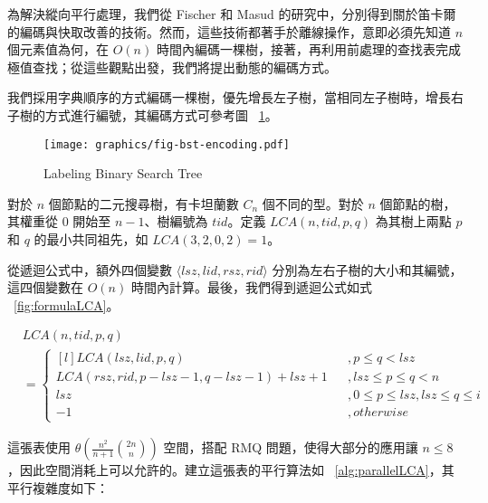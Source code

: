 \documentclass{gapd}
\begin{document}
為解決縱向平行處理，我們從 Fischer \cite{fischer} 和 Masud \cite{masud} 的研究中，分別得到關於笛卡爾的編碼與快取改善的技術。然而，這些技術都著手於離線操作，意即必須先知道 $n$ 個元素值為何，在 $O(n)$ 時間內編碼一棵樹，接著，再利用前處理的查找表完成極值查找；從這些觀點出發，我們將提出動態的編碼方式。

我們採用字典順序的方式編碼一棵樹，優先增長左子樹，當相同左子樹時，增長右子樹的方式進行編號，其編碼方式可參考圖 ~\ref{fig:lablingBST}。

\begin{figure}[!thb]
  \centering
  \texttt{[image: graphics/fig-bst-encoding.pdf]}
  \caption{Labeling Binary Search Tree}
  \label{fig:lablingBST}
\end{figure}

對於 $n$ 個節點的二元搜尋樹，有卡坦蘭數 $C_n$ 個不同的型。對於 $n$ 個節點的樹，其權重從 $0$ 開始至 $n-1$、樹編號為 $\mathit{tid}$。定義 $\mathit{LCA}(n, \mathit{tid}, p, q)$ 為其樹上兩點 $p$ 和 $q$ 的最小共同祖先，如 $\mathit{LCA}(3, 2, 0, 2) = 1$。

從遞迴公式中，額外四個變數 $\langle\mathit{lsz},\mathit{lid},\mathit{rsz},\mathit{rid}\rangle$ 分別為左右子樹的大小和其編號，這四個變數在 $O(n)$ 時間內計算。最後，我們得到遞迴公式如式 ~\ref{fig:formulaLCA}。 

\begin{figure*}[!thb]
\begin{equation*}
  \begin{split}
    &\mathit{LCA}(n, \mathit{tid}, p, q) \\
      &= \left\{\begin{matrix*}[l]
        \mathit{LCA}(\mathit{lsz}, \mathit{lid}, p, q) &&, p \le q < \mathit{lsz}\\ 
        \mathit{LCA}(\mathit{rsz}, \mathit{rid}, p-\mathit{lsz}-1, q-\mathit{lsz}-1)+\mathit{lsz}+1 &&, 
            \mathit{lsz} \le p \le q < n \\ 
        \mathit{lsz} && , 0 \le p \le \mathit{lsz}, \mathit{lsz} \le q \le i\\ 
        -1 && ,\mathit{otherwise}
      \end{matrix*}\right.
  \end{split}
\end{equation*}
\caption{Recursion Formula for labeling BST}
\label{fig:formulaLCA}
\end{figure*}

這張表使用 $\theta\left(\frac{n^2}{n+1} \binom{2n}{n}\right)$ 空間，搭配 RMQ 問題，使得大部分的應用讓 $n \le 8$，因此空間消耗上可以允許的。建立這張表的平行算法如 ~\ref{alg:parallelLCA}，其平行複雜度如下：
\end{document}
